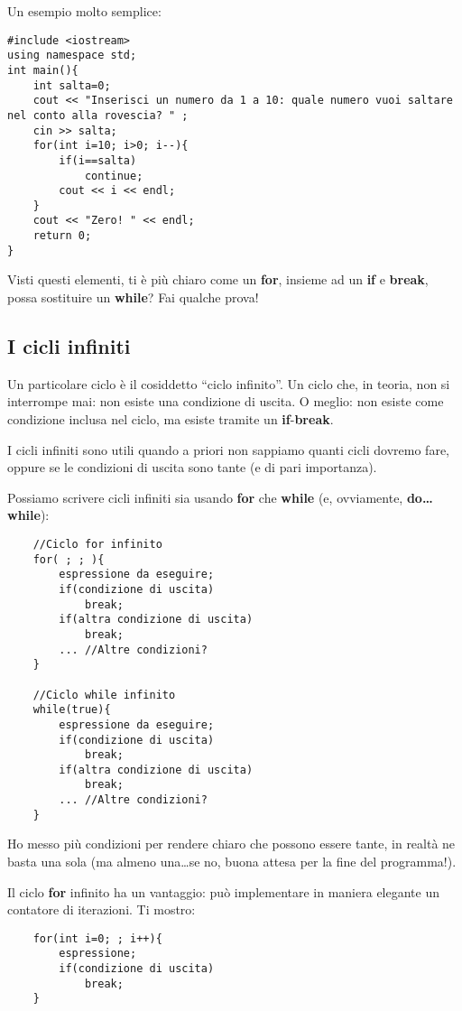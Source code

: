 	Un esempio molto semplice:
	\begin{lstlisting}
#include <iostream>
using namespace std;
int main(){
	int salta=0;
	cout << "Inserisci un numero da 1 a 10: quale numero vuoi saltare nel conto alla rovescia? " ;
	cin >> salta;
	for(int i=10; i>0; i--){
		if(i==salta)
			continue;
		cout << i << endl;
	}
	cout << "Zero! " << endl;
	return 0;
}
	\end{lstlisting}
	
	
	Visti questi elementi, ti è più chiaro come un \textbf{for}, insieme ad un \textbf{if} e \textbf{break}, possa sostituire un \textbf{while}? Fai qualche prova!

	\subsection{I cicli infiniti} 
	Un particolare ciclo è il cosiddetto ``ciclo infinito''. Un ciclo che, in teoria, non si interrompe mai: non esiste una condizione di uscita. O meglio: non esiste come condizione inclusa nel ciclo, ma esiste tramite un \textbf{if}-\textbf{break}. 
	
	I cicli infiniti sono utili quando a priori non sappiamo quanti cicli dovremo fare, oppure se le condizioni di uscita sono tante (e di pari importanza). 
	
	Possiamo scrivere cicli infiniti sia usando \textbf{for} che \textbf{while} (e, ovviamente, \textbf{do\ldots while}):
	\begin{lstlisting}
	//Ciclo for infinito
	for( ; ; ){
		espressione da eseguire;
		if(condizione di uscita)
			break;
		if(altra condizione di uscita)
			break;
		... //Altre condizioni?	
	}
	
	//Ciclo while infinito
	while(true){
		espressione da eseguire;
		if(condizione di uscita)
			break;
		if(altra condizione di uscita)
			break;
		... //Altre condizioni?		
	}
	\end{lstlisting}
	
	Ho messo più condizioni per rendere chiaro che possono essere tante, in realtà ne basta una sola (ma almeno una\ldots se no, buona attesa per la fine del programma!).
	
	Il ciclo \textbf{for} infinito ha un vantaggio: può implementare in maniera elegante un contatore di iterazioni. Ti mostro:
	\begin{lstlisting}
	for(int i=0; ; i++){
		espressione;
		if(condizione di uscita)
			break;	
	}
	\end{lstlisting}
	
